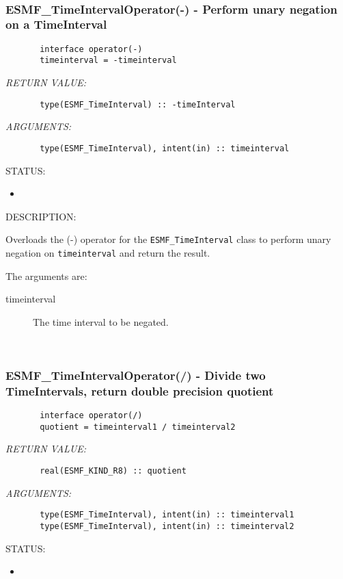  
\mbox{}\hrulefill\ 
 
\subsubsection [ESMF\_TimeIntervalOperator(-)] {ESMF\_TimeIntervalOperator(-) - Perform unary negation on a TimeInterval}


  
\begin{verbatim}       interface operator(-)
       timeinterval = -timeinterval\end{verbatim}{\em RETURN VALUE:}
\begin{verbatim}       type(ESMF_TimeInterval) :: -timeInterval\end{verbatim}{\em ARGUMENTS:}
\begin{verbatim}       type(ESMF_TimeInterval), intent(in) :: timeinterval\end{verbatim}
{\sf STATUS:}
   \begin{itemize}
   \item{}
   \end{itemize}
  
{\sf DESCRIPTION:\\ }


       Overloads the (-) operator for the {\tt ESMF\_TimeInterval} class to
       perform unary negation on {\tt timeinterval} and return the result.
  
       The arguments are:
       \begin{description}
       \item[timeinterval]
            The time interval to be negated.
       \end{description}
   
 
\mbox{}\hrulefill\ 
 
\subsubsection [ESMF\_TimeIntervalOperator(/)] {ESMF\_TimeIntervalOperator(/) - Divide two TimeIntervals, return double precision quotient}


  
\begin{verbatim}       interface operator(/)
       quotient = timeinterval1 / timeinterval2\end{verbatim}{\em RETURN VALUE:}
\begin{verbatim}       real(ESMF_KIND_R8) :: quotient\end{verbatim}{\em ARGUMENTS:}
\begin{verbatim}       type(ESMF_TimeInterval), intent(in) :: timeinterval1
       type(ESMF_TimeInterval), intent(in) :: timeinterval2\end{verbatim}
{\sf STATUS:}
   \begin{itemize}
   \item{}
   \end{itemize}
  

